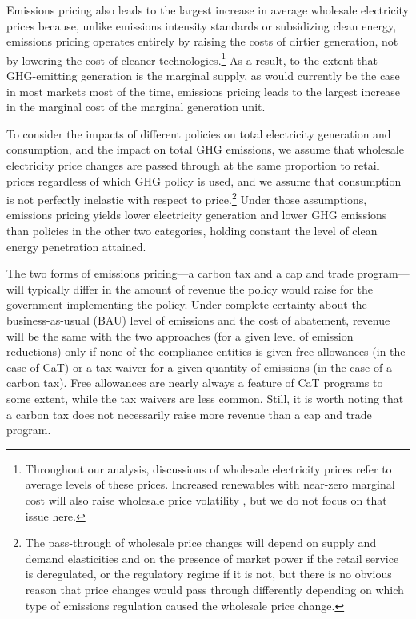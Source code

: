 \documentclass[12pt]{article}
\begin{document}
Emissions pricing also leads to the largest increase in average wholesale electricity prices because, unlike emissions intensity standards or subsidizing clean energy, emissions pricing operates entirely by raising the costs of dirtier generation, not by lowering the cost of cleaner technologies.\footnote{Throughout our analysis, discussions of wholesale electricity prices refer to average levels of these prices. Increased renewables with near-zero marginal cost will also raise wholesale price volatility \citep{junge2022properties}, but we do not focus on that issue here.} As a result, to the extent that GHG-emitting generation is the marginal supply, as would currently be the case in most markets most of the time, emissions pricing leads to the largest increase in the marginal cost of the marginal generation unit.

To consider the impacts of different policies on total electricity generation and consumption, and the impact on total GHG emissions, we assume that wholesale electricity price changes are passed through at the same proportion to retail prices regardless of which GHG policy is used, and we assume that consumption is not perfectly inelastic with respect to price.\footnote{The pass-through of wholesale price changes will depend on supply and demand elasticities and on the presence of market power if the retail service is deregulated, or the regulatory regime if it is not, but there is no obvious reason that price changes would pass through differently depending on which type of emissions regulation caused the wholesale price change.}  Under those assumptions, emissions pricing yields lower electricity generation and lower GHG emissions than policies in the other two categories, holding constant the level of clean energy penetration attained.

The two forms of emissions pricing---a carbon tax and a cap and trade program---will typically differ in the amount of revenue the policy would raise for the government implementing the policy. Under complete certainty about the business-as-usual (BAU) level of emissions and the cost of abatement, revenue will be the same with the two approaches (for a given level of emission reductions) only if none of the compliance entities is given free allowances (in the case of CaT) or a tax waiver for a given quantity of emissions (in the case of a carbon tax).  Free allowances are nearly always a feature of CaT programs to some extent, while the tax waivers are less common.  Still, it is worth noting that a carbon tax does not necessarily raise more revenue than a cap and trade program.
\end{document}
